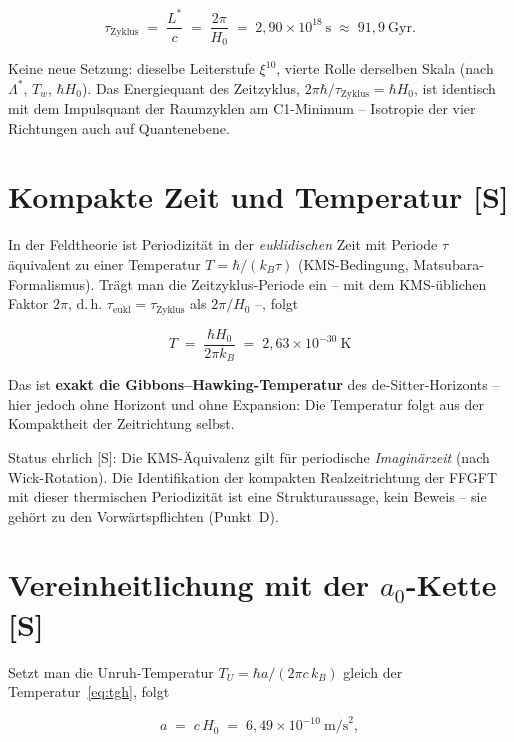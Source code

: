 \documentclass[11pt]{report}
\begin{document}
\begin{equation}
  \tau_\text{Zyklus} \;=\; \frac{L^{*}}{c}
  \;=\; \frac{2\pi}{H_0}
  \;=\; 2{,}90\times10^{18}~\text{s}
  \;\approx\; 91{,}9~\text{Gyr}.
  \label{eq:tauzyk}
\end{equation}

Keine neue Setzung: dieselbe Leiterstufe $\xi^{10}$, vierte Rolle
derselben Skala (nach $\Lambda^{*}$, $T_w$, $\hbar H_0$). Das
Energiequant des Zeitzyklus, $2\pi\hbar/\tau_\text{Zyklus}
= \hbar H_0$, ist identisch mit dem Impulsquant der Raumzyklen am
C1-Minimum -- Isotropie der vier Richtungen auch auf Quantenebene.

\section{Kompakte Zeit und Temperatur [S]}

In der Feldtheorie ist Periodizität in der \emph{euklidischen} Zeit
mit Periode $\tau$ äquivalent zu einer Temperatur
$T = \hbar/(k_B\tau)$ (KMS-Bedingung, Matsubara-Formalismus). Trägt
man die Zeitzyklus-Periode ein -- mit dem KMS-üblichen Faktor
$2\pi$, d.\,h. $\tau_\text{eukl} = \tau_\text{Zyklus}$ als
$2\pi/H_0$ --, folgt

\begin{equation}
  \boxed{\;T \;=\; \frac{\hbar H_0}{2\pi k_B}
  \;=\; 2{,}63\times10^{-30}~\text{K}\;}
  \label{eq:tgh}
\end{equation}

Das ist \textbf{exakt die Gibbons--Hawking-Temperatur} des
de-Sitter-Horizonts -- hier jedoch ohne Horizont und ohne Expansion:
Die Temperatur folgt aus der Kompaktheit der Zeitrichtung selbst.

Status ehrlich [S]: Die KMS-Äquivalenz gilt für periodische
\emph{Imaginärzeit} (nach Wick-Rotation). Die Identifikation der
kompakten Realzeitrichtung der FFGFT mit dieser thermischen
Periodizität ist eine Strukturaussage, kein Beweis -- sie gehört zu
den Vorwärtspflichten (Punkt~D).

\section{Vereinheitlichung mit der $a_0$-Kette [S]}

Setzt man die Unruh-Temperatur $T_U = \hbar a/(2\pi c\,k_B)$ gleich
der Temperatur~\eqref{eq:tgh}, folgt

\begin{equation}
  a \;=\; c\,H_0 \;=\; 6{,}49\times10^{-10}~\text{m/s}^2,
\end{equation}
\end{document}

